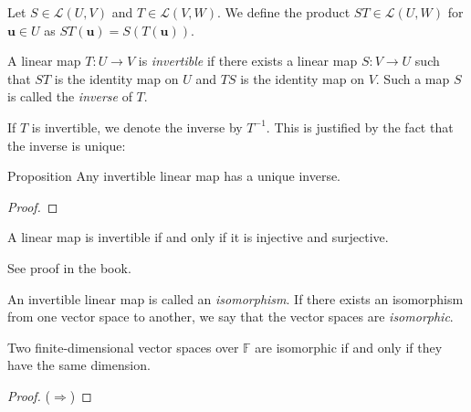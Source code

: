 \documentclass [aspectratio=169]{beamer}
\newcommand{\bu}{{\mathbf{u}}}
\newcommand{\F}{{\mathbb{F}}}
\newcommand{\cL}{{\mathcal{L}}}
\newcommand{\inv}{{-1}}
\begin{document}
\begin{frame}
\begin{definition}
Let $S \in \cL(U,V)$ and $T \in \cL(V,W)$. We define the product $ST \in \cL(U,W)$ for $\bu\in U$ as $ST(\bu) = S(T(\bu))$.
\end{definition}

\begin{definition}
A linear map $T: U \to V$ is \emph{invertible} if there exists a linear map $S: V \to U$ such that $ST$ is the identity map on $U$ and $TS$ is the identity map on $V$. Such a map $S$ is called the \emph{inverse} of $T$. 
\end{definition}

If $T$ is invertible, we denote the inverse by $T^\inv$. This is justified by the fact that the inverse is unique:

\end{frame}




\begin{frame}
\begin{exampleblock}{Proposition}
Any invertible linear map has a unique inverse.
\end{exampleblock}
\begin{proof}
\vspace{4cm}
\end{proof}


\end{frame}

\begin{frame}

\begin{theorem}
A linear map is invertible if and only if it is injective and surjective.
\end{theorem}

See proof in the book.

\begin{definition}
An invertible linear map is called an \emph{isomorphism}. If there exists an isomorphism from one vector space to another, we say that the vector spaces are \emph{isomorphic}.
\end{definition}
\end{frame}

\begin{frame}
\begin{theorem}
Two finite-dimensional vector spaces over $\F$ are isomorphic if and only if they have the same dimension.
\end{theorem}
\begin{proof}
($\Rightarrow$) 

\vspace{4cm}

\end{proof}

\end{frame}
\end{document}
